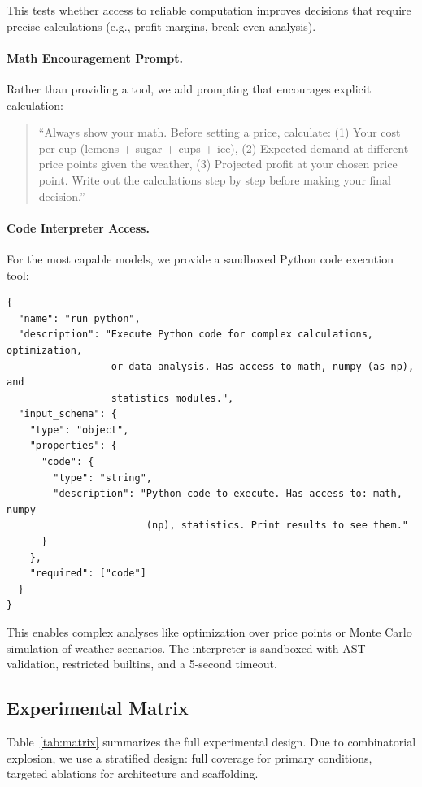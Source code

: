 This tests whether access to reliable computation improves decisions that require precise calculations (e.g., profit margins, break-even analysis).

\paragraph{Math Encouragement Prompt.}
Rather than providing a tool, we add prompting that encourages explicit calculation:
\begin{quote}
\small\ttfamily
``Always show your math. Before setting a price, calculate: (1) Your cost per cup (lemons + sugar + cups + ice), (2) Expected demand at different price points given the weather, (3) Projected profit at your chosen price point. Write out the calculations step by step before making your final decision.''
\end{quote}

\paragraph{Code Interpreter Access.}
For the most capable models, we provide a sandboxed Python code execution tool:
\begin{verbatim}
{
  "name": "run_python",
  "description": "Execute Python code for complex calculations, optimization, 
                  or data analysis. Has access to math, numpy (as np), and 
                  statistics modules.",
  "input_schema": {
    "type": "object",
    "properties": {
      "code": {
        "type": "string", 
        "description": "Python code to execute. Has access to: math, numpy 
                        (np), statistics. Print results to see them."
      }
    },
    "required": ["code"]
  }
}
\end{verbatim}

This enables complex analyses like optimization over price points or Monte Carlo simulation of weather scenarios. The interpreter is sandboxed with AST validation, restricted builtins, and a 5-second timeout.

\subsection{Experimental Matrix}
\label{sec:matrix}

Table~\ref{tab:matrix} summarizes the full experimental design. Due to combinatorial explosion, we use a stratified design: full coverage for primary conditions, targeted ablations for architecture and scaffolding.

